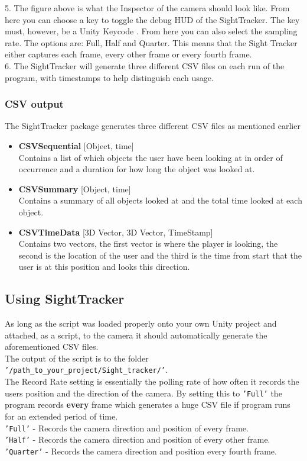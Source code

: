 \documentclass[letterpaper]{article}
\begin{document}
\begin{itemize}
5. The figure above is what the Inspector of the camera should look like. From here you can choose a key to toggle the debug HUD of the SightTracker. The key must, however, be a Unity Keycode \cite{unitykeycode}. From here you can also select the sampling rate. The options are: Full, Half and Quarter. This means that the Sight Tracker either captures each frame, every other frame or every fourth frame.\\[0.15in]
6. The SightTracker will generate three different CSV files on each run of the program, with timestamps to help distinguish each usage.
\end{itemize}
\subsubsection{CSV output}
The SightTracker package generates three different CSV files as mentioned earlier\\
\begin{itemize}
\item \textbf{CSVSequential} [Object, time]\\
Contains a list of which objects the user have been looking at in order of occurrence and a duration for how long the object was looked at.
\item \textbf{CSVSummary} [Object, time]\\
Contains a summary of all objects looked at and the total time looked at each object.
\item \textbf{CSVTimeData} [3D Vector, 3D Vector, TimeStamp]\\
Contains two vectors, the first vector is where the player is looking, the second is the location of the user and the third is the time from start that the user is at this position and looks this direction.
\end{itemize}
\pagebreak
\subsection{Using SightTracker}
As long as the script was loaded properly onto your own Unity project and attached, as a script, to the camera it should automatically generate the aforementioned CSV files.\\
The output of the script is to the folder \texttt{'/path\_to\_your\_project/Sight\_tracker/'}.\\
The Record Rate setting is essentially the polling rate of how often it records the users position and the direction of the camera. By setting this to \texttt{'Full'} the program records \textbf{every} frame which generates a huge CSV file if program runs for an extended period of time.\\[0.15in]
\texttt{'Full'} - Records the camera direction and position of every frame.\\
\texttt{'Half'} - Records the camera direction and position of every other frame.\\
\texttt{'Quarter'} - Records the camera direction and position every fourth frame.
\end{document}
